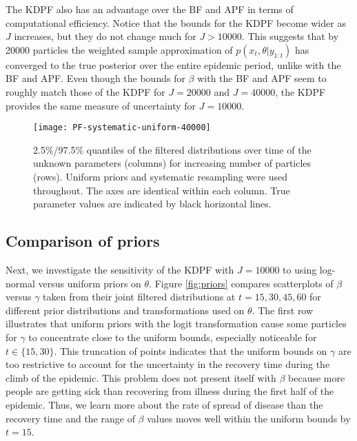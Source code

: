 \documentclass{elsarticle}
\begin{document}
The KDPF also has an advantage over the BF and APF in terms of computational efficiency. Notice that the bounds for the KDPF become wider as $J$ increases, but they do not change much for $J > 10000$. This suggests that by 20000 particles the weighted sample approximation of $p(x_t,\theta|y_{1:t})$ has converged to the true posterior over the entire epidemic period, unlike with the BF and APF. Even though the bounds for $\beta$ with the BF and APF seem to roughly match those of the KDPF for $J = 20000$ and $J = 40000$, the KDPF provides the same measure of uncertainty for $J = 10000$.

\begin{figure}
\centering
\texttt{[image: PF-systematic-uniform-40000]}
\caption{2.5\%/97.5\% quantiles of the filtered distributions over time of the unknown parameters (columns) for increasing number of particles (rows). Uniform priors and systematic resampling were used throughout. The axes are identical within each column. True parameter values are indicated by black horizontal lines.} \label{fig:pfs}
\end{figure}

\subsection{Comparison of priors}

Next, we investigate the sensitivity of the KDPF with $J = 10000$ to using log-normal versus uniform priors on $\theta$.  Figure \ref{fig:priors} compares scatterplots of $\beta$ versus $\gamma$ taken from their joint filtered distributions at $t = 15, 30, 45, 60$ for different prior distributions and transformations used on $\theta$. The first row illustrates that uniform priors with the logit transformation cause some particles for $\gamma$ to concentrate close to the uniform bounds, especially noticeable for $t \in \{15, 30\}$.  This truncation of points indicates that the uniform bounds on $\gamma$ are too restrictive to account for the uncertainty in the recovery time during the climb of the epidemic. This problem does not present itself with $\beta$ because more people are getting sick than recovering from illness during the first half of the epidemic. Thus, we learn more about the rate of spread of disease than the recovery time and the range of $\beta$ values moves well within the uniform bounds by $t = 15$.
\end{document}
